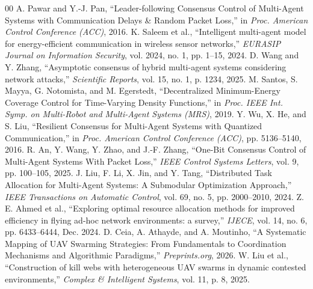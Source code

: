 \documentclass[conference]{IEEEtran}
\begin{document}
\begin{thebibliography}{00}
 A. Pawar and Y.-J. Pan, ``Leader-following Consensus Control of Multi-Agent Systems with Communication Delays \& Random Packet Loss,'' in \textit{Proc. American Control Conference (ACC)}, 2016.
 K. Saleem et al., ``Intelligent multi-agent model for energy-efficient communication in wireless sensor networks,'' \textit{EURASIP Journal on Information Security}, vol. 2024, no. 1, pp. 1--15, 2024.
 D. Wang and Y. Zhang, ``Asymptotic consensus of hybrid multi-agent systems considering network attacks,'' \textit{Scientific Reports}, vol. 15, no. 1, p. 1234, 2025.
 M. Santos, S. Mayya, G. Notomista, and M. Egerstedt, ``Decentralized Minimum-Energy Coverage Control for Time-Varying Density Functions,'' in \textit{Proc. IEEE Int. Symp. on Multi-Robot and Multi-Agent Systems (MRS)}, 2019.
 Y. Wu, X. He, and S. Liu, ``Resilient Consensus for Multi-Agent Systems with Quantized Communication,'' in \textit{Proc. American Control Conference (ACC)}, pp. 5136--5140, 2016.
 R. An, Y. Wang, Y. Zhao, and J.-F. Zhang, ``One-Bit Consensus Control of Multi-Agent Systems With Packet Loss,'' \textit{IEEE Control Systems Letters}, vol. 9, pp. 100--105, 2025.
 J. Liu, F. Li, X. Jin, and Y. Tang, ``Distributed Task Allocation for Multi-Agent Systems: A Submodular Optimization Approach,'' \textit{IEEE Transactions on Automatic Control}, vol. 69, no. 5, pp. 2000--2010, 2024.
 Z. E. Ahmed et al., ``Exploring optimal resource allocation methods for improved efficiency in flying ad-hoc network environments: a survey,'' \textit{IJECE}, vol. 14, no. 6, pp. 6433--6444, Dec. 2024.
 D. Ceia, A. Athayde, and A. Moutinho, ``A Systematic Mapping of UAV Swarming Strategies: From Fundamentals to Coordination Mechanisms and Algorithmic Paradigms,'' \textit{Preprints.org}, 2026.
 W. Liu et al., ``Construction of kill webs with heterogeneous UAV swarms in dynamic contested environments,'' \textit{Complex \& Intelligent Systems}, vol. 11, p. 8, 2025.
\end{thebibliography}
\end{document}
